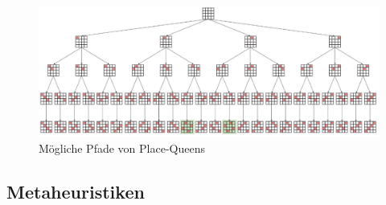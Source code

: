 \documentclass[
    ngerman,
    color=3b,
    dark_mode,
    load_common, %
    summary,
    boxarc,
]{tuda_summary}
\begin{document}
\begin{figure}[h]
    \centering
    \includegraphics[width=16cm]{pictures/damenSuchbaum.PNG}
    \caption{Mögliche Pfade von Place-Queens}
\end{figure}



\pagebreak

\subsection{Metaheuristiken}
\end{document}
